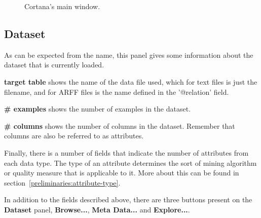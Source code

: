 \documentclass{article}
\begin{document}
\begin{figure}
\begin{center}
\centering
{}
\caption{Cortana's main window.}
\end{center}
\label{fig:mainwindow}
\end{figure}


\subsection{Dataset}
\label{main:dataset}
As can be expected from the name, this panel gives some information about the dataset that is currently loaded.

{\bf target table} shows the name of the data file used, which for text files is just the filename, and for ARFF files is the name defined in the '@relation' field.

{\bf\# examples} shows the number of examples in the dataset.

{\bf\# columns} shows the number of columns in the dataset.
Remember that columns are also be referred to as attributes.

Finally, there is a number of fields that indicate the number of attributes from each data type.
The type of an attribute determines the sort of mining algorithm or quality measure that is applicable to it.
More about this can be found in section~\ref{preliminaries:attribute-type}.

In addition to the fields described above, there are three buttons present on the {\bf Dataset} panel, {\bf Browse...}, {\bf Meta Data...} and {\bf Explore...}.
\end{document}
